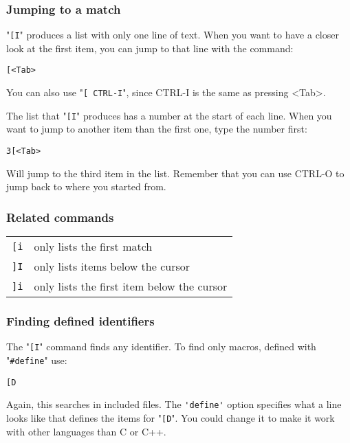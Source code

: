 \subsubsection{Jumping to a match}
"\verb![I!" produces a list with only one line of text.
When you want to have a closer look at the first item, you can jump to that line with the command:

\begin{Verbatim}[samepage=true]
 [<Tab>
\end{Verbatim}

You can also use "\verb![ CTRL-I!", since CTRL-I is the same as pressing <Tab>.

The list that "\verb![I!" produces has a number at the start of each line.
When you want to jump to another item than the first one, type the number first:

\begin{Verbatim}[samepage=true]
 3[<Tab>
\end{Verbatim}

Will jump to the third item in the list.
Remember that you can use CTRL-O to jump back to where you started from.
\subsubsection{Related commands}

\begin{center} \begin{tabular}{c l}
\verb![i! & only lists the first match \\
\verb!]I! & only lists items below the cursor \\
\verb!]i! & only lists the first item below the cursor \\
\end{tabular} \end{center}

\subsubsection{Finding defined identifiers}
The "\verb![I!" command finds any identifier.
To find only macros, defined with "\verb!#define!" use:

\begin{Verbatim}[samepage=true]
 [D
\end{Verbatim}

Again, this searches in included files.
The \verb!'define'! option specifies what a line looks like that defines the items for "\verb![D!".
You could change it to make it work with other languages than C or C++.

